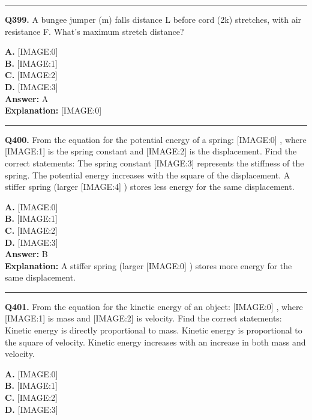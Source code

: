 \documentclass[12pt]{article}
\begin{document}
\hrule
\vspace{1em}


\noindent
\textbf{Q399.} A bungee jumper (m) falls distance L before cord (2k) stretches, with air resistance F. What's maximum stretch distance?



\textbf{A.} [IMAGE:0] \\
\textbf{B.} [IMAGE:1] \\
\textbf{C.} [IMAGE:2] \\
\textbf{D.} [IMAGE:3] \\

\textbf{Answer:} A \\
\textbf{Explanation:} [IMAGE:0]

\hrule
\vspace{1em}


\noindent
\textbf{Q400.} From the equation for the potential energy of a spring:
[IMAGE:0]
, where
[IMAGE:1]
is the spring constant and
[IMAGE:2]
is the displacement. Find the correct statements:
The spring constant
[IMAGE:3]
represents the stiffness of the spring.
The potential energy increases with the square of the displacement.
A stiffer spring (larger
[IMAGE:4]
) stores less energy for the same displacement.



\textbf{A.} [IMAGE:0] \\
\textbf{B.} [IMAGE:1] \\
\textbf{C.} [IMAGE:2] \\
\textbf{D.} [IMAGE:3] \\

\textbf{Answer:} B \\
\textbf{Explanation:} A stiffer spring (larger
[IMAGE:0]
) stores more energy for the same displacement.

\hrule
\vspace{1em}


\noindent
\textbf{Q401.} From the equation for the kinetic energy of an object:
[IMAGE:0]
, where
[IMAGE:1]
is mass and
[IMAGE:2]
is velocity. Find the correct statements:
Kinetic energy is directly proportional to mass.
Kinetic energy is proportional to the square of velocity.
Kinetic energy increases with an increase in both mass and velocity.



\textbf{A.} [IMAGE:0] \\
\textbf{B.} [IMAGE:1] \\
\textbf{C.} [IMAGE:2] \\
\textbf{D.} [IMAGE:3] \\
\end{document}
